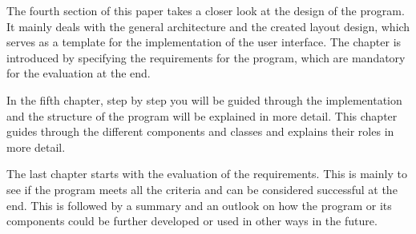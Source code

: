 The fourth section of this paper takes a closer look at the design of the program. It mainly deals with the general architecture and the created layout design, which serves as a template for the implementation of the user interface. The chapter is introduced by specifying the requirements for the program, which are mandatory for the evaluation at the end.

In the fifth chapter, step by step you will be guided through the implementation and the structure of the program will be explained in more detail. This chapter guides through the different components and classes and explains their roles in more detail.

The last chapter starts with the evaluation of the requirements. This is mainly to see if the program meets all the criteria and can be considered successful at the end. This is followed by a summary and an outlook on how the program or its components could be further developed or used in other ways in the future.